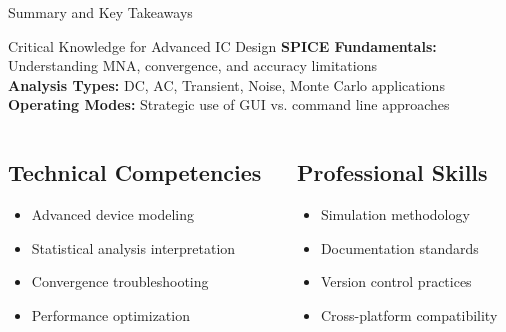 \documentclass{beamer}
\begin{document}
\begin{frame}{Summary and Key Takeaways}
    \begin{alertblock}{Critical Knowledge for Advanced IC Design}
        \textbf{SPICE Fundamentals:} Understanding MNA, convergence, and accuracy limitations \\
        \textbf{Analysis Types:} DC, AC, Transient, Noise, Monte Carlo applications \\
        \textbf{Operating Modes:} Strategic use of GUI vs. command line approaches
    \end{alertblock}
    
    \begin{columns}
        \begin{column}{0.5\textwidth}
            \subsection{Technical Competencies}
            \begin{itemize}
                \item Advanced device modeling
                \item Statistical analysis interpretation
                \item Convergence troubleshooting
                \item Performance optimization
            \end{itemize}
        \end{column}
        \begin{column}{0.5\textwidth}
            \subsection{Professional Skills}
            \begin{itemize}
                \item Simulation methodology
                \item Documentation standards
                \item Version control practices
                \item Cross-platform compatibility
            \end{itemize}
        \end{column}
    \end{columns}
\end{frame}
\end{document}
